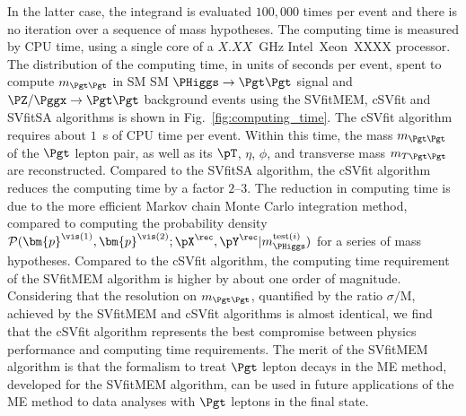 In the latter case, the integrand is evaluated $100,000$ times per event and there is no
iteration over a sequence of mass hypotheses.
The computing time is measured by CPU time, 
using a single core of a $X.XX$~GHz Intel\TReg~Xeon\TReg~XXXX processor.
The distribution of the computing time, in units of seconds per event, 
spent to compute $m_{\Pgt\Pgt}$
in SM SM $\PHiggs \to \Pgt\Pgt$ signal and $\PZ/\Pggx \to \Pgt\Pgt$ background events
using the SVfitMEM, cSVfit and SVfitSA algorithms is shown in
Fig.~\ref{fig:computing_time}.
The cSVfit algorithm requires about $1$~s of CPU time per event.
Within this time, the mass $m_{\Pgt\Pgt}$ of the $\Pgt$ lepton pair,
as well as its $\pT$, $\eta$, $\phi$, and transverse mass
$m_{T\Pgt\Pgt}$ are reconstructed.
Compared to the SVfitSA algorithm, the cSVfit algorithm reduces the
computing time by a factor $2$--$3$. 
The reduction in computing time is
due to the more efficient Markov chain Monte
Carlo integration method, compared to
computing the probability density
$\mathcal{P}(\bm{p}^{\vis(1)},\bm{p}^{\vis(2)};\pX^{\rec},\pY^{\rec}|m_{\PHiggs}^{\textrm{test}(i)})$
for a series of mass hypotheses.
Compared to the cSVfit algorithm, the computing time requirement of the SVfitMEM algorithm is higher
by about one order of magnitude. 
Considering that the resolution on $m_{\Pgt\Pgt}$,
quantified by the ratio $\sigma/\textrm{M}$, achieved
by the SVfitMEM and cSVfit algorithms is almost identical, we find that the cSVfit
algorithm represents the best compromise between physics performance and computing time requirements.
The merit of the SVfitMEM algorithm is that the 
formalism to treat $\Pgt$ lepton decays in the ME method, developed
for the SVfitMEM algorithm, can be used
in future applications of the ME method to data analyses with $\Pgt$
leptons in the final state.

